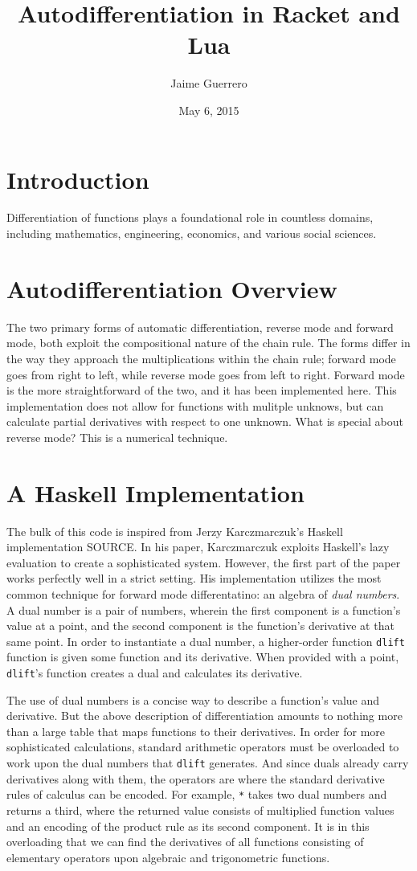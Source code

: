 \documentclass{article}
\author{Jaime Guerrero}
\date{May 6, 2015}
\title{Autodifferentiation in Racket and Lua}
\begin{document}
\maketitle

\section{Introduction}
Differentiation of functions plays a foundational role in countless domains,
including mathematics, engineering, economics, and various social sciences.


\section{Autodifferentiation Overview}
The two primary forms of automatic differentiation, reverse mode and forward
mode, both exploit the compositional nature of the chain rule.  The forms differ
in the way they approach the multiplications within the chain rule; forward mode
goes from right to left, while reverse mode goes from left to right.  Forward
mode is the more straightforward of the two, and it has been implemented here.
This implementation does not allow for functions with mulitple unknows, but can
calculate partial derivatives with respect to one unknown.  What is special
about reverse mode? This is a numerical technique.


\section{A Haskell Implementation}
The bulk of this code is inspired from Jerzy Karczmarczuk's Haskell
implementation SOURCE.  In his paper, Karczmarczuk exploits Haskell's lazy
evaluation to create a sophisticated system.  However, the first part of the
paper works perfectly well in a strict setting.  His implementation utilizes the
most common technique for forward mode differentatino: an algebra of
\textit{dual numbers}.  A dual number is a pair of numbers, wherein the first
component is a function's value at a point, and the second component is the
function's derivative at that same point. In order to instantiate a dual number,
a higher-order function \texttt{dlift} function is given some function and its
derivative.  When provided with a point, \texttt{dlift}'s function creates
a dual and calculates its derivative.

The use of dual numbers is a concise way to describe a function's value and
derivative.  But the above description of differentiation amounts to nothing
more than a large table that maps functions to their derivatives.  In order for
more sophisticated calculations, standard arithmetic operators must be
overloaded to work upon the dual numbers that \texttt{dlift} generates.  And
since duals already carry derivatives along with them, the operators are where
the standard derivative rules of calculus can be encoded.  For example,
\texttt{*} takes two dual numbers and returns a third, where the returned value
consists of multiplied function values and an encoding of the product rule as
its second component.  It is in this overloading that we can find the
derivatives of all functions consisting of elementary operators upon algebraic
and trigonometric functions.
\end{document}
